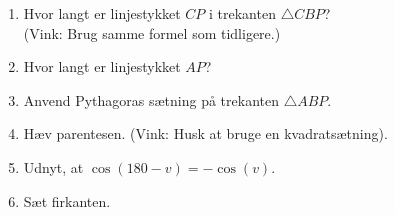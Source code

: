 \begin{enumerate}[label=\roman*)]
	\item Hvor langt er linjestykket $CP$ i trekanten $\triangle CBP$? \\
	(Vink: Brug samme formel som tidligere.)
	\item Hvor langt er linjestykket $AP$?
	\item Anvend Pythagoras sætning på trekanten $\triangle ABP$.
	\item Hæv parentesen. (Vink: Husk at bruge en kvadratsætning).
	\item Udnyt, at $\cos(180 - v) = -\cos(v)$.
	\item Sæt firkanten.
\end{enumerate}

